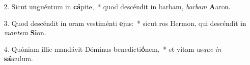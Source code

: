 2. Sicut unguéntum in \textbf{cá}pite,~*  quod descéndit in barbam, \textit{bar}\textit{bam} \textbf{A}aron.\

3. Quod descéndit in oram vestiménti \textbf{e}jus:~*  sicut ros Hermon, qui descéndit in \textit{mon}\textit{tem} \textbf{Si}on.\

4. Quóniam illic mandávit Dóminus benedicti\textbf{ó}nem,~*  et vitam us\textit{que} \textit{in} \textbf{sǽ}culum.\

